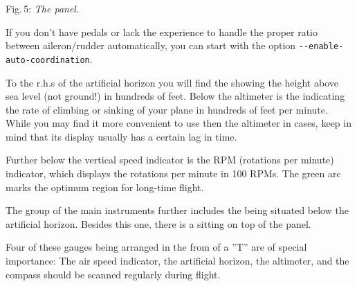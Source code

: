  \centerline{}

\smallskip
 \noindent
Fig.\,5: \textit{The panel.}
\medskip

If you don't have pedals or lack the experience to handle the proper ratio between aileron/rudder automatically, you can start
\FlightGear{} with the option \texttt{-$ $-enable-auto-coordination}.

To the r.h.s of the artificial horizon you will find the  showing the height
above sea level (not ground!) in hundreds of feet.  Below the altimeter is the
 indicating the rate of climbing or sinking of your plane
in hundreds of feet per minute. While you may find it more convenient to use then the
altimeter in cases, keep in mind that its display usually has a certain lag in time.

Further below the vertical speed indicator is the RPM (rotations per minute)
indicator, which displays the rotations per minute  in 100 RPMs. The
green arc marks the optimum region for long-time flight.

The group of the main instruments further includes the  being
situated below the artificial horizon. Besides this one, there is a  sitting on top of the panel.

Four of these gauges being arranged in the from of a ''T'' are of special importance: The
air speed indicator, the artificial horizon, the altimeter, and the compass should be
scanned regularly during flight.

